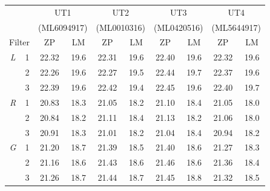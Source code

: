 \begin{colsection}
\begin{table}[p]
    \begin{center}
        \begin{tabular}{cc|cc|cc|cc|cc} %
             & &
            \multicolumn{2}{c|}{UT1} &
            \multicolumn{2}{c|}{UT2} &
            \multicolumn{2}{c|}{UT3} &
            \multicolumn{2}{c}{UT4}
            \\
             & &
            \multicolumn{2}{c|}{{\footnotesize(ML6094917)}} &
            \multicolumn{2}{c|}{{\footnotesize(ML0010316)}} &
            \multicolumn{2}{c|}{{\footnotesize(ML0420516)}} &
            \multicolumn{2}{c}{{\footnotesize(ML5644917)}}
            \\
            \multicolumn{2}{c|}{Filter} &
            ZP & LM & ZP & LM & ZP & LM & ZP & LM \\
            \midrule
            \textit{L} & 1 &
            22.32 & 19.6 &
            22.31 & 19.6 &
            22.40 & 19.6 &
            22.32 & 19.6
            \\
            & 2 &
            22.26 & 19.6 &
            22.27 & 19.5 &
            22.44 & 19.7 &
            22.37 & 19.6
            \\
            & 3 &
            22.39 & 19.6 &
            22.42 & 19.4 &
            22.45 & 19.6 &
            22.40 & 19.7
            \\
            \midrule
            \textit{R} & 1 &
            20.83 & 18.3 &
            21.05 & 18.2 &
            21.10 & 18.4 &
            21.05 & 18.0
            \\
            & 2 &
            20.84 & 18.2 &
            21.11 & 18.4 &
            21.13 & 18.2 &
            21.06 & 18.0
            \\
            & 3 &
            20.91 & 18.3 &
            21.01 & 18.2 &
            21.04 & 18.4 &
            20.94 & 18.2
            \\
            \midrule
            \textit{G} & 1 &
            21.20 & 18.7 &
            21.39 & 18.5 &
            21.40 & 18.6 &
            21.27 & 18.3
            \\
            & 2 &
            21.16 & 18.6 &
            21.43 & 18.6 &
            21.46 & 18.6 &
            21.36 & 18.4
            \\
            & 3 &
            21.26 & 18.7 &
            21.44 & 18.7 &
            21.45 & 18.8 &
            21.32 & 18.5
            \\
            \midrule

\end{tabular}
\end{center}
\end{table}
\end{colsection}
